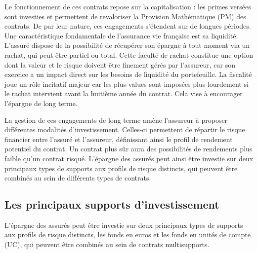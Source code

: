 Le fonctionnement de ces contrats repose sur la capitalisation : les primes versées sont investies et permettent de revaloriser la Provision Mathématique (PM) des contrats. De par leur nature, ces engagements s'étendent sur de longues périodes. Une caractéristique fondamentale de l'assurance vie française est sa liquidité. L'assuré dispose de la possibilité de récupérer son épargne à tout moment via un rachat, qui peut être partiel ou total. Cette faculté de rachat constitue une option dont la valeur et le risque doivent être finement gérés par l'assureur, car son exercice a un impact direct sur les besoins de liquidité du portefeuille. La fiscalité joue un rôle incitatif majeur car les plus-values sont imposées plus lourdement si le rachat intervient avant la huitième année du contrat. Cela vise à encourager l'épargne de long terme.

La gestion de ces engagements de long terme amène l'assureur à proposer différentes modalités d'investissement. Celles-ci permettent de répartir le risque financier entre l'assuré et l'assureur, définissant ainsi le profil de rendement potentiel du contrat. Un contrat plus sûr aura des possibilités de rendements plus faible qu'un contrat risqué. L'épargne des assurés peut ainsi être investie sur deux principaux types de supports aux profils de risque distincts, qui peuvent être combinés au sein de différents types de contrats.

\subsection{Les principaux supports d'investissement}

L'épargne des assurés peut être investie sur deux principaux types de supports aux profils de risque distincts, les fonds en euros et les fonds en unités de compte (UC), qui peuvent être combinés au sein de contrats multisupports.



